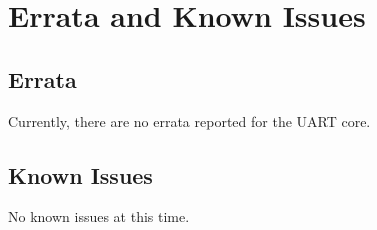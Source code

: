 \section{Errata and Known Issues}

\subsection{Errata}
Currently, there are no errata reported for the UART core.

\subsection{Known Issues}
No known issues at this time.

